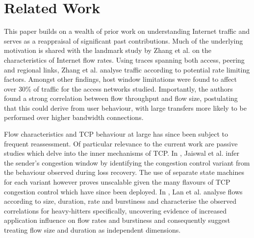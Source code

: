 \section{Related Work}
\label{section:malawi:related}

This paper builds on a wealth of prior work on understanding Internet traffic and serves as a reappraisal of significant past contributions. 
Much of the underlying motivation is shared with the landmark study by Zhang et al. \cite{Zhang:2002p85} on the characteristics of Internet flow rates.
Using traces spanning both access, peering and regional links, Zhang et al. analyse traffic according to potential rate limiting factors.
Amongst other findings, host window limitations were found to affect over 30\% of traffic for the access networks studied.
Importantly, the authors found a strong correlation between flow throughput and flow size, postulating that this could derive from user behaviour, with large transfers more likely to be performed over higher bandwidth connections.

Flow characteristics and TCP behaviour at large has since been subject to frequent reassessment.
Of particular relevance to the current work are passive studies which delve into the inner mechanisms of TCP.
In \cite{Jaiswal:2004p242}, Jaiswal et al. infer the sender's congestion window by identifying the congestion control variant from the behaviour observed during loss recovery.
The use of separate state machines for each variant however proves unscalable given the many flavours of TCP congestion control which have since been deployed.
In \cite{Lan:2006p566}, Lan et al. analyse flows according to size, duration, rate and burstiness and characterise the observed correlations for heavy-hitters specifically,
uncovering evidence of increased application influence on flow rates and burstiness and consequently suggest treating flow size and duration as independent dimensions.



